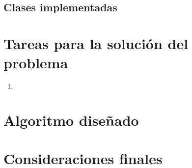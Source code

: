 \documentclass{article}
\begin{document}
\subsection{Clases implementadas}


\section{Tareas para la solución del problema} \label{tareas}
\begin{enumerate}
\item 


\end{enumerate}

\section{Algoritmo diseñado} \label{algorimo}

\section{Consideraciones finales} \label{consideracionesfinales}
\end{document}
